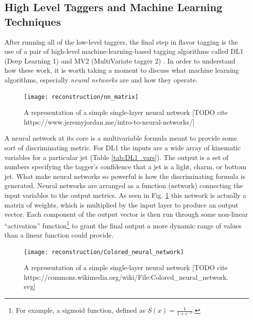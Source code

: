         \FloatBarrier
        \subsection{High Level Taggers and Machine Learning Techniques}\label{sec:ml_techniques}

            After running all of the low-level taggers,
                the final step in flavor tagging is the use of a pair of high-level machine-learning-based tagging algorithms
                called DL1 (Deep Learning 1) and MV2 (MultiVariate tagger 2)
                \cite{bjet_id_and_performance} \cite{btagging_optimisation}.
            In order to understand how these work, it is worth taking a moment to discuss what machine learning algorithms,
                especially \textit{neural networks} are and how they operate.

            \begin{figure}[tbh] \center
                \texttt{[image: reconstruction/nn\_matrix]}
                \caption{
                    A representation of a simple single-layer neural network
                    [TODO cite https://www.jeremyjordan.me/intro-to-neural-networks/]
                }
                \label{fig:nn_matrix}
            \end{figure}

            A neural network at its core is a multivariable formula meant to provide some sort of discriminating metric\cite{MLatLHC}.
            For DL1 the inputs are a wide array of kinematic variables for a particular jet (Table \ref{tab:DL1_vars}).
            The output is a set of numbers specifying the tagger's confidence that a jet is
                a light, charm, or bottom jet.
            What make neural networks so powerful is how the discriminating formula is generated.
            Neural networks are arranged as a function (network) connecting the input variables to the output metrics. 
            As seen in Fig. \ref{fig:nn_matrix} this network is actually a matrix of weights,
                which is multiplied by the input layer to produce an output vector.
            Each component of the output vector is then run through some non-linear ``activation'' function\footnote{
                    For example, a sigmoid function, defined as $S(x) = \frac{1}{1+e^{-x}}$.
                } to grant the final output a more dynamic range of values than a linear function could provide.

            \begin{figure}[tbh] \center
                \texttt{[image: reconstruction/Colored\_neural\_network]}
                \caption{
                    A representation of a simple single-layer neural network
                    [TODO cite https://commons.wikimedia.org/wiki/File:Colored\_neural\_network.svg]
                }
                \label{fig:colored_neural_network}
            \end{figure}

